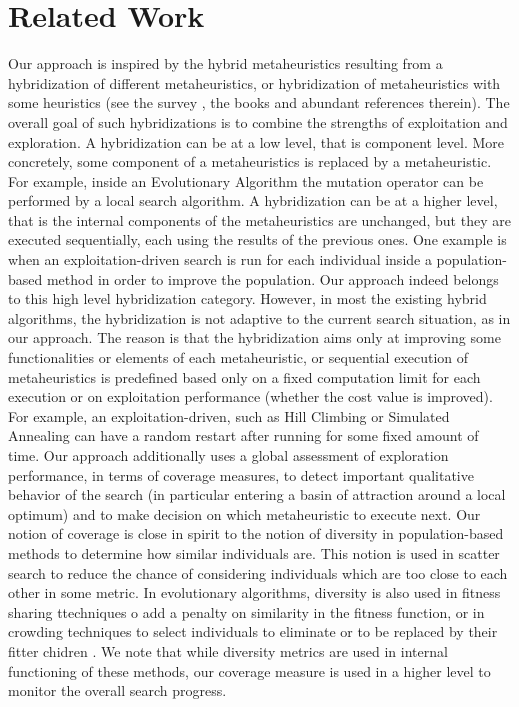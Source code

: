 \section{Related Work}
Our approach is inspired by the hybrid metaheuristics resulting from a hybridization of different metaheuristics, or hybridization of metaheuristics with some heuristics (see the survey \cite{Talbi2009}, the books \cite{Lones2011,Talbi2013} and abundant references therein). The overall goal of such hybridizations is to combine the strengths of exploitation and exploration. A hybridization can be at a low level, that is component level. More concretely, some component of a metaheuristics is replaced by a metaheuristic. For example, inside an Evolutionary Algorithm the mutation operator can be performed by a local search algorithm. A hybridization can be at a higher level, that is the internal components of the metaheuristics are unchanged, but they are executed sequentially, each using the results of the previous ones. One example is when an exploitation-driven search is run for each individual inside a population-based method in order to improve the population. Our approach indeed belongs to this high level hybridization category. However, in most the existing hybrid algorithms, the hybridization is not adaptive to the current search situation, as in our approach. The reason is that the hybridization aims only at improving some functionalities or elements of each metaheuristic, or sequential execution of metaheuristics is predefined based only on a fixed computation limit for each execution or on exploitation performance (whether the cost value is improved). For example, an exploitation-driven, such as Hill Climbing or Simulated Annealing can have a random restart after running for some fixed amount of time. Our approach additionally uses a global assessment of exploration performance, in terms of coverage measures, to detect important qualitative behavior of the search (in particular entering a basin of attraction around a local optimum) and to make decision on which metaheuristic to execute next. Our notion of coverage is close in spirit to the notion of diversity in population-based methods to determine how similar individuals are. This notion is used in scatter search \cite{Glover2011} to reduce the chance of considering individuals which are too close to each other in some metric. In evolutionary algorithms, diversity is also used in fitness sharing ttechniques o add a penalty on similarity in the fitness function, or in crowding techniques to select individuals to eliminate or to be replaced by their fitter chidren \cite{WongWMPZ2012}. We note that while diversity metrics are used in internal functioning of these methods, our coverage measure is used in a higher level to monitor the overall search progress.
